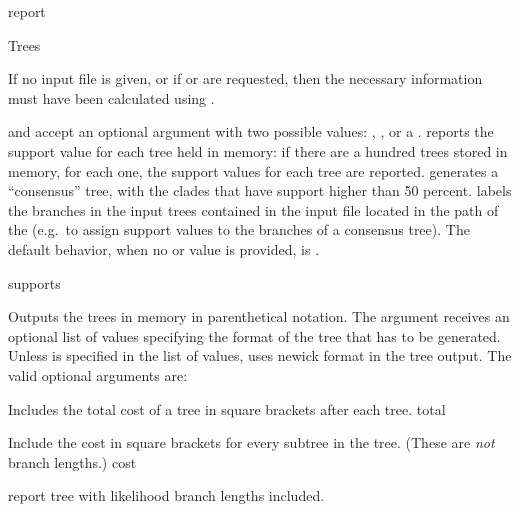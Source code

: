 \begin{command}{report}{}
\begin{arguments}
\begin{argumentgroup}{Trees}
{                If no input file is given, or if  or
                 are requested,
                then the necessary information must have been calculated 
                using .
                
                 and  accept an
                optional argument with two possible values:
                , , or a
                \poystring.
                reports the support value for each tree held in memory: if there
                are a hundred trees stored in memory, for each one, the support
                values for each tree are reported. 
                generates a ``consensus'' tree, with the clades that have
                support higher than 50 percent. \poystring labels the branches
                in the input trees contained in the input file located in the path of
                the \poystring (e.g.\ to assign support values to the branches of a consensus
                tree). The default behavior, when no
                 or  value is
                provided, is .}
                {supports}

                {Outputs the trees in memory in parenthetical notation. The argument
                 receives an optional list of values
                specifying the format of the tree that has to be generated.
                Unless  is specified in the list of values, 
                 uses newick format in the tree output. The
                valid optional arguments are:  
                
                \begin{description}
                        {Includes the total cost of a tree in square brackets after each tree.}
                        {total}

                        {Include the cost in square brackets for every subtree in the tree. (These 
                        are \emph{not} branch lengths.)}
                        {cost}

                        {report tree with likelihood branch lengths included.}
                        {}


\end{description}}
\end{argumentgroup}
\end{arguments}
\end{command}
